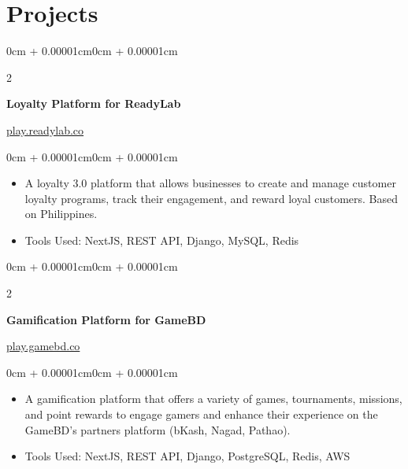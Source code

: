 \documentclass[10pt, letterpaper]{article}
\newenvironment{highlights}{
  \begin{itemize}[
    topsep=0.10cm,
    parsep=0.10cm,
    partopsep=0pt,
    itemsep=0pt,
    leftmargin=0cm + 10pt
  ]
}{
  \end{itemize}
}
\newenvironment{onecolentry}{\begin{adjustwidth}{0cm + 0.00001cm}{0cm + 0.00001cm}}{\end{adjustwidth}}
\newenvironment{twocolentry}[2][]{
  \onecolentry
  \def\secondColumn{#2}
  \setcolumnwidth{\fill, 4.5cm}
  \begin{paracol}{2}
}{
  \switchcolumn \raggedleft \secondColumn
  \end{paracol}
  \endonecolentry
}
\begin{document}




\section{Projects}

\begin{twocolentry}{\href{https://play.readylab.co/}{play.readylab.co}}
  \textbf{Loyalty Platform for ReadyLab}
\end{twocolentry}

\vspace{0.10cm}

\begin{onecolentry}
  \begin{highlights}
    \item A loyalty 3.0 platform that allows businesses to create and manage customer loyalty programs, track their engagement, and reward loyal customers. Based on Philippines.
    \item Tools Used: NextJS, REST API, Django, MySQL, Redis
  \end{highlights}
\end{onecolentry}

\vspace{0.2cm}

\begin{twocolentry}{\href{https://play.gamebd.co/}{play.gamebd.co}}
  \textbf{Gamification Platform for GameBD}
\end{twocolentry}

\vspace{0.10cm}

\begin{onecolentry}
  \begin{highlights}
    \item A gamification platform that offers a variety of games, tournaments, missions, and point rewards to engage gamers and enhance their experience on the GameBD's partners platform (bKash, Nagad, Pathao).
    \item Tools Used: NextJS, REST API, Django, PostgreSQL, Redis, AWS
  \end{highlights}
\end{onecolentry}
\end{document}
